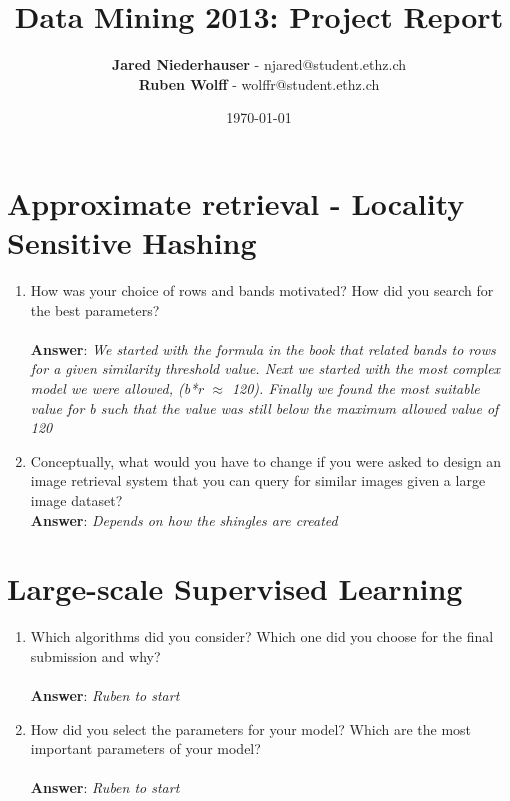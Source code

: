\documentclass[11pt]{article}
\title{Data Mining 2013: Project Report}
\author{\textbf{Jared Niederhauser} - njared@student.ethz.ch\\
\textbf{Ruben Wolff} - wolffr@student.ethz.ch}
\date{\today}
\begin{document}
\maketitle

\section{Approximate retrieval - Locality Sensitive Hashing}
\begin{enumerate}
\item How was your choice of rows and bands motivated? How did you search for the
best parameters? \\ \\
\textbf{Answer}: \emph{We started with the formula in the book that related bands
to rows for a given similarity threshold value.  Next we started with the most
complex model we were allowed, (b*r $\approx$ 120). Finally we found the most
suitable value for b such that the value was still below the maximum allowed
value of 120}

\item Conceptually, what would you have to change if you were asked to design an image
  retrieval system that you can query for similar images given a large image
  dataset? \\

\textbf{Answer}: \emph{Depends on how the shingles are created}

\end{enumerate}

\section{Large-scale Supervised Learning}

\begin{enumerate}
\item Which algorithms did you consider? Which one did you choose for the
  final submission and why? \\ \\
\textbf{Answer}: \emph{Ruben to start}

\item How did you select the parameters for your model? Which are the
  most important parameters of your model? \\ \\
\textbf{Answer}: \emph{Ruben to start}

\end{enumerate}
\end{document}
